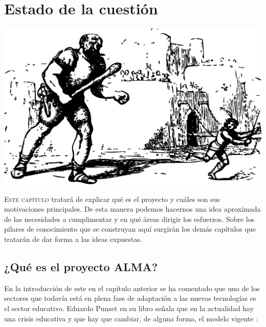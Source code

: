 \chapter{Estado de la cuestión}
\label{chapter:estado-cuestion}

\begin{center}
\includegraphics[scale=0.4]{../graphics/johnny_automatic_Giant_chases_Jack.eps}
\end{center}

\lettrine{E}{ste capítulo} tratará de explicar qué es el proyecto \alma{} y cuáles son sus motivaciones principales. De esta manera podemos hacernos una idea aproximada de las necesidades a cumplimentar y en qué áreas dirigir los esfuerzos. Sobre los pilares de conocimiento que se construyan aquí surgirán los demás capítulos que tratarán de dar forma a las ideas expuestas.

\section{¿Qué es el proyecto ALMA?}

En la introducción de este \pfc{} en el capítulo anterior  se ha comentado que uno de los sectores que todavía está en plena fase de adaptación a las nuevas tecnologías es el sector educativo. Eduardo Punset en su libro  señala que en la actualidad hay una crisis educativa y que hay que cambiar, de alguna forma, el modelo vigente \cite[No todos los niños son iguales, pág.~50]{libro:excusas-para-no-pensar}:

